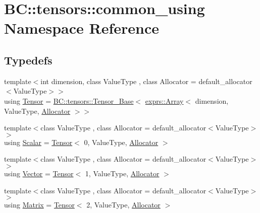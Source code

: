 \hypertarget{namespaceBC_1_1tensors_1_1common__using}{}\section{BC\+:\+:tensors\+:\+:common\+\_\+using Namespace Reference}
\label{namespaceBC_1_1tensors_1_1common__using}
\subsection*{Typedefs}
\begin{DoxyCompactItemize}
\item 
{\footnotesize template$<$int dimension, class Value\+Type , class Allocator  = default\+\_\+allocator$<$\+Value\+Type$>$$>$ }\\using \hyperlink{namespaceBC_1_1tensors_1_1common__using_ae0b2983dde17bb7904dc64aa0cb9a676}{Tensor} = \hyperlink{classBC_1_1tensors_1_1Tensor__Base}{B\+C\+::tensors\+::\+Tensor\+\_\+\+Base}$<$ \hyperlink{classBC_1_1tensors_1_1exprs_1_1Array}{exprs\+::\+Array}$<$ dimension, Value\+Type, \hyperlink{namespaceBC_a934f94b17b06290e6b241e5f59930c5f}{Allocator} $>$$>$
\item 
{\footnotesize template$<$class Value\+Type , class Allocator  = default\+\_\+allocator$<$\+Value\+Type$>$$>$ }\\using \hyperlink{namespaceBC_1_1tensors_1_1common__using_a22de9a173f6aa6b07a3b4f543c9ad5c1}{Scalar} = \hyperlink{namespaceBC_1_1tensors_1_1common__using_ae0b2983dde17bb7904dc64aa0cb9a676}{Tensor}$<$ 0, Value\+Type, \hyperlink{namespaceBC_a934f94b17b06290e6b241e5f59930c5f}{Allocator} $>$
\item 
{\footnotesize template$<$class Value\+Type , class Allocator  = default\+\_\+allocator$<$\+Value\+Type$>$$>$ }\\using \hyperlink{namespaceBC_1_1tensors_1_1common__using_ab2d6784064c0dda8aef3c2a9177ffa77}{Vector} = \hyperlink{namespaceBC_1_1tensors_1_1common__using_ae0b2983dde17bb7904dc64aa0cb9a676}{Tensor}$<$ 1, Value\+Type, \hyperlink{namespaceBC_a934f94b17b06290e6b241e5f59930c5f}{Allocator} $>$
\item 
{\footnotesize template$<$class Value\+Type , class Allocator  = default\+\_\+allocator$<$\+Value\+Type$>$$>$ }\\using \hyperlink{namespaceBC_1_1tensors_1_1common__using_a6fc3153d379a42b1a97df46ed5b71a29}{Matrix} = \hyperlink{namespaceBC_1_1tensors_1_1common__using_ae0b2983dde17bb7904dc64aa0cb9a676}{Tensor}$<$ 2, Value\+Type, \hyperlink{namespaceBC_a934f94b17b06290e6b241e5f59930c5f}{Allocator} $>$
$$
\end{DoxyCompactItemize}
